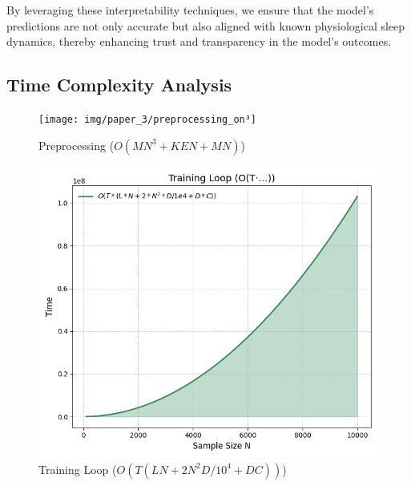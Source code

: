 By leveraging these interpretability techniques, we ensure that the model's predictions are not only accurate but also aligned with known physiological sleep dynamics, thereby enhancing trust and transparency in the model's outcomes.









































\subsection{Time Complexity Analysis}

\begin{figure}[H]
	\centering
	\begin{minipage}[b]{0.40\linewidth}
		\centering
		\texttt{[image: img/paper\_3/preprocessing\_on³]}
		\caption{Preprocessing (\(O(MN^3 + KEN + MN)\))}
		\label{fig:preprocessingon3}
	\end{minipage}
	\hfill
	\begin{minipage}[b]{0.40\linewidth}
		\centering
		\includegraphics[width=\linewidth]{img/paper_3/training_loop_ot·…}
		\caption{Training Loop (\(O(T(LN + 2N^2D/10^4 + DC))\))}
		\label{fig:trainingloopot}
	\end{minipage}
\end{figure}


